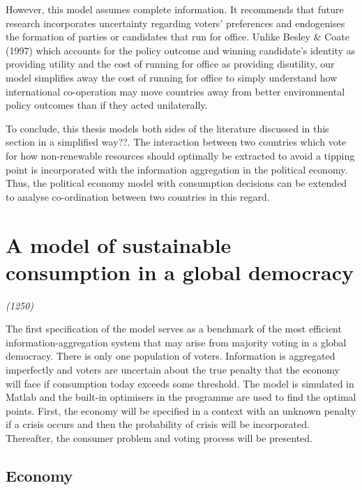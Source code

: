 \documentclass[11pt,preprint, authoryear]{elsarticle}
\numberwithin{equation}{section}
\numberwithin{figure}{section}
\numberwithin{table}{section}
\begin{document}
However, this model assumes complete information. It recommends that
future research incorporates uncertainty regarding voters' preferences
and endogenises the formation of parties or candidates that run for
office. Unlike Besley \& Coate (1997) which accounts for the policy
outcome and winning candidate's identity as providing utility and the
cost of running for office as providing disutility, our model simplifies
away the cost of running for office to simply understand how
international co-operation may move countries away from better
environmental policy outcomes than if they acted unilaterally.

To conclude, this thesis models both sides of the literature discussed
in this section in a simplified way??. The interaction between two
countries which vote for how non-renewable resources should optimally be
extracted to avoid a tipping point is incorporated with the information
aggregation in the political economy. Thus, the political economy model
with consumption decisions can be extended to analyse co-ordination
between two countries in this regard.

\hypertarget{a-model-of-sustainable-consumption-in-a-global-democracy}{%
\section{A model of sustainable consumption in a global
democracy}\label{a-model-of-sustainable-consumption-in-a-global-democracy}}

\emph{(1250)}

The first specification of the model serves as a benchmark of the most
efficient information-aggregation system that may arise from majority
voting in a global democracy. There is only one population of voters.
Information is aggregated imperfectly and voters are uncertain about the
true penalty that the economy will face if consumption today exceeds
some threshold. The model is simulated in Matlab and the built-in
optimisers in the programme are used to find the optimal points. First,
the economy will be specified in a context with an unknown penalty if a
crisis occurs and then the probability of crisis will be incorporated.
Thereafter, the consumer problem and voting process will be presented.

\hypertarget{economy}{%
\subsection*{Economy}\label{economy}}
\end{document}
